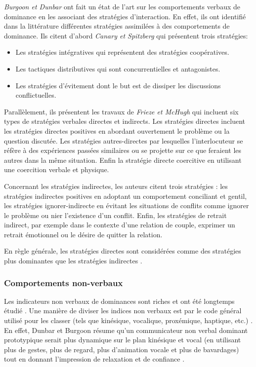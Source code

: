 			\emph{Burgoon et Dunbar} \cite{dunbar2005perceptions} ont fait un état de l'art sur les comportements verbaux de dominance en les associant des stratégies d'interaction. En effet, ils ont identifié dans la littérature différentes stratégies assimilées à des comportements de dominance. Ils citent d'abord \emph{Canary et Spitzberg} \cite{canary1987} qui présentent trois stratégies: 
			\begin{itemize}
				\item Les stratégies intégratives qui représentent des stratégies coopératives.
				\item Les tactiques distributives qui sont concurrentielles et antagonistes.
				\item Les stratégies d'évitement dont le but est de dissiper les discussions conflictuelles. 
			\end{itemize}
			
			Parallèlement, ils présentent les travaux de \emph{Frieze et McHugh} \cite{frieze1992power} qui incluent six types de stratégies verbales directes et indirects. 
			Les stratégies directes incluent les stratégies	directes positives en abordant ouvertement le problème ou la question discutée. Les stratégies autres-directes par lesquelles l'interlocuteur se réfère à des expériences passées similaires ou se projette sur ce que feraient les autres dans la même situation. Enfin la stratégie directe coercitive en utilisant une coercition verbale et physique. 
			
			Concernant les stratégies indirectes, les auteurs citent trois stratégies : les stratégies indirectes positives en adoptant un comportement conciliant et gentil, les stratégies ignorer-indirecte en évitant les situations de conflits comme ignorer le problème ou nier l'existence d'un conflit. Enfin, les stratégies de retrait indirect, par exemple dans le contexte d'une relation de couple, exprimer un retrait émotionnel ou le désire de quitter la relation. 
		
			En règle générale, les stratégies directes sont considérées comme des stratégies plus dominantes que les stratégies indirectes \cite{dunbar2005perceptions}.
			
		\subsubsection{Comportements non-verbaux}
			Les indicateurs non verbaux de dominances sont riches et ont été longtemps étudié \cite{burgoon1995interpersonal,burgoon1998nature}. Une manière de diviser les indices non verbaux est par le code général utilisé pour les classer (tels que kinésique, vocalique, proxémique, haptique, etc.) \cite{burgoon2006nonverbal}. En effet, Dunbar et Burgoon \cite{dunbar2005perceptions} résume qu'un communicateur non verbal dominant prototypique serait plus dynamique sur le plan kinésique et vocal (en utilisant plus de gestes, plus de regard, plus d'animation vocale et plus de bavardages) tout en donnant l'impression de relaxation et de confiance .
			
